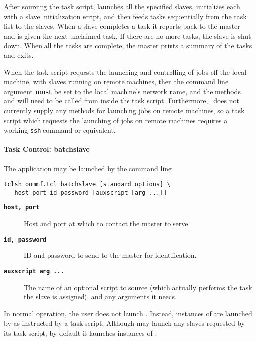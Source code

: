 After sourcing the task script,  launches all the
specified slaves, initializes each with a slave initialization script,
and then feeds tasks sequentially from the task list to the slaves.
When a slave completes a task it reports back to the master and is given
the next unclaimed task.  If there are no more tasks, the slave is shut
down.  When all the tasks are complete, the master prints a summary of
the tasks and exits.

When the task script requests the launching and controlling of jobs off
the local machine, with slaves running on remote machines, then the
command line argument  {\bf must} be set to the local machine's
network name, and the  methods  and
 will need to be called from inside the task script.
Furthermore, \OOMMF\ does not currently supply any methods for launching
jobs on remote machines, so a task script which requests the launching
of jobs on remote machines requires a working
\verb+ssh+ command or
equivalent.

\paragraph{Task Control: batchslave}\par
The application  may be launched by the command line:
\begin{verbatim}
tclsh oommf.tcl batchslave [standard options] \
   host port id password [auxscript [arg ...]]
\end{verbatim}
\begin{description}
\item[{\tt\bf host, port}]
  Host and port at which to contact the master to serve.
\item[{\tt\bf id, password}]
  ID and password to send to the master for identification.
\item[{\tt\bf auxscript arg ...}]
  The name of an optional script to source (which actually performs the
  task the slave is assigned), and any arguments it needs.
\end{description}

In normal operation, the user does not launch
.  Instead, instances of  are
launched by  as instructed by a task script.
Although \app{batchmaster} may launch any slaves requested
by its task script, by default it launches instances of
.

